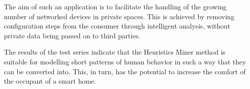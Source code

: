 The aim of such an application is to facilitate the handling of the growing number of networked devices in private spaces. This is achieved by removing configuration steps from the consumer through intelligent analysis, without private data being passed on to third parties. 

The results of the test series indicate that the Heuristics Miner method is suitable for modelling short patterns of human behavior in such a way that they can be converted into. This, in turn, has the potential to increase the comfort of the occupant of a smart home.
